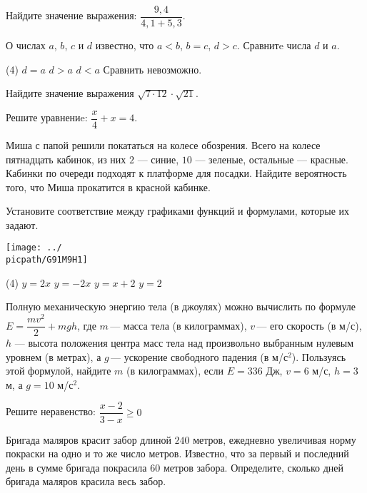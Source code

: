\begin{homework}[number=1]
	\begin{listofex}
		\item Найдите значение выражения: \(\dfrac{9,4}{4,1+5,3}\).
		\item О числах \( a \), \( b\), \( c \) и \( d \) известно, что \( a<b \), \( b=c \), \( d>c \). Сравнитe числа \( d \) и \( a \).
		\begin{tasks}(4)
			\task \( d=a \)
			\task \( d>a \)
			\task \( d<a \)
			\task Сравнить невозможно.
		\end{tasks}
		\item Найдите значение выражения \( \sqrt{7\cdot12}\cdot\sqrt{21} \).
		\item Решите уравнениe: \(\dfrac{x}{4}+x=4\).
		\item Миша с папой решили покататься на колесе обозрения. Всего на колесе пятнадцать кабинок, из них \( 2 \) --- синие, \( 10 \) --- зеленые, остальные  --- красные. Кабинки по очереди подходят к платформе для посадки. Найдите вероятность того, что Миша прокатится в красной кабинке.
		\item Установите соответствие между графиками функций и формулами, которые их задают.
		\begin{center}
			\texttt{[image: ../\\picpath/G91M9H1]}
		\end{center}
		\begin{tasks}(4)
			\task \( y=2x \)
			\task \( y=-2x \)
			\task \( y=x+2 \)
			\task \( y=2 \)
		\end{tasks}
		\item Полную механическую энергию тела (в джоулях) можно вычислить по формуле \( E=\dfrac{mv^2}{2}+mgh \),  где \( m \) --- масса тела (в килограммах), \( v \) --- его скорость (в м/с), \( h \) --- высота положения центра масс тела над произвольно выбранным нулевым уровнем (в метрах), а \( g \) --- ускорение свободного падения (в м/с\( ^2 \)). Пользуясь этой формулой, найдите \( m \) (в килограммах), если \( E=336 \) Дж,  \( v=6 \) м/с, \( h=3 \) м, а \( g=10 \) м/с\( ^2 \). 
		\item Решите неравенство: \( \dfrac{x-2}{3-x}\ge0 \)
		\item Бригада маляров красит забор длиной \( 240 \) метров, ежедневно увеличивая норму покраски на одно и то же число метров. Известно, что за первый и последний день в сумме бригада покрасила \( 60 \) метров забора. Определите, сколько дней бригада маляров красила весь забор.

\end{listofex}
\end{homework}
